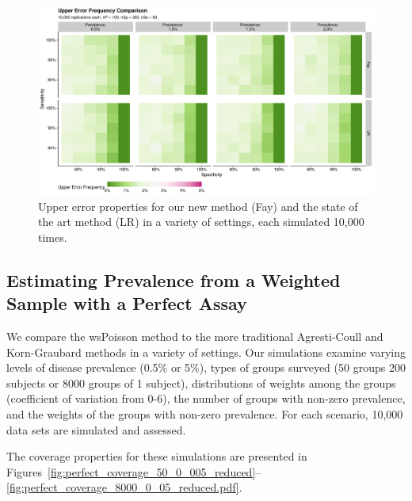 \documentclass[AMA,STIX1COL]{WileyNJD-v2}
\begin{document}
\begin{figure}
    \centering
    \includegraphics[width=\textwidth]{figures/upper_error_frequency_comparison_plot}
    \caption{Upper error properties for our new method (Fay) and the state of the art method (LR) in a variety of settings, each simulated 10,000 times.}
    \label{fig:upper_error_frequency_comparison_plot}
\end{figure}

\subsection{Estimating Prevalence from a Weighted Sample with a Perfect Assay}

We compare the wsPoisson method to the more traditional Agresti-Coull and Korn-Graubard methods in a variety of settings.
Our simulations examine varying levels of disease prevalence (0.5\% or 5\%), types of groups surveyed (50 groups 200 subjects or 8000 groups of 1 subject), distributions of weights among the groups (coefficient of variation from 0-6), the number of groups with non-zero prevalence, and the weights of the groups with non-zero prevalence.
For each scenario, 10,000 data sets are simulated and assessed.

The coverage properties for these simulations are presented in Figures~\ref{fig:perfect_coverage_50_0_005_reduced}--\ref{fig:perfect_coverage_8000_0_05_reduced.pdf}.
\end{document}
